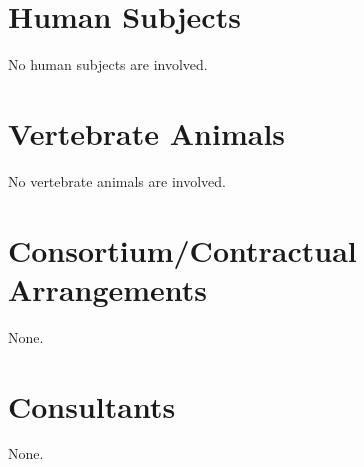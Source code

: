 \documentclass[12pt]{article}%
\begin{document}

\section{Human Subjects}

No human subjects are involved.

\section{Vertebrate Animals}

No vertebrate animals are involved.




\section{Consortium/Contractual Arrangements}

None.


\section{Consultants}

None.

\eject

%
\end{document}
